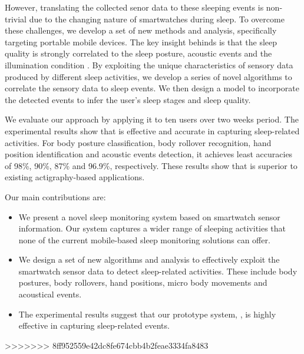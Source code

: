However, translating the collected senor data to these sleeping events is non-trivial due to the changing nature of smartwatches during
sleep. To overcome these challenges, we develop a set of new methods and analysis, specifically targeting portable mobile devices.  The key
insight behinds {\systemname} is that the sleep quality is strongly correlated to the sleep posture, acoustic events and the illumination
condition \cite{shelgikar2016sleep}. By exploiting the unique characteristics of sensory data produced by different sleep activities, we
develop a series of novel algorithms to correlate the sensory data to sleep events. We then design a model to incorporate the detected
events to
infer the user's sleep stages and sleep quality.

We evaluate our approach by applying it to ten users over two weeks period. The experimental results show that {\systemname} is  effective
and accurate in capturing sleep-related activities. For body posture classification, body rollover recognition, hand position
identification and  acoustic events detection,  it achieves least accuracies of 98\%,  90\%,  87\% and  96.9\%, respectively. These results
show that {\systemname}  is superior to existing actigraphy-based applications.

Our main contributions are:

\begin{itemize}[itemsep=1mm,nolistsep]

\item We present a novel sleep monitoring system based on smartwatch sensor information. Our system captures a wider range of sleeping
    activities that none of the current mobile-based sleep monitoring solutions can offer.

\item We design a set of new algorithms and analysis to effectively exploit the smartwatch sensor data to detect sleep-related
    activities. These include body postures, body rollovers, hand positions, micro body movements and acoustical events.

\item The experimental results suggest that our prototype system, \systemname, is highly effective in capturing sleep-related events.

\end{itemize}
>>>>>>> 8ff952559e42dc8fe674cbb4b2feae3334fa8483

